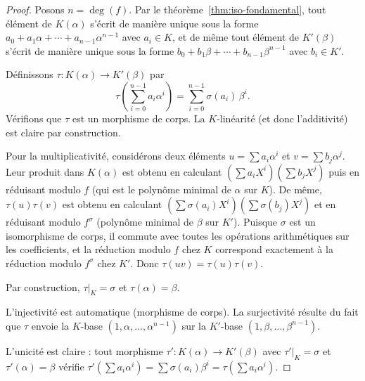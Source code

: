 \documentclass[12pt,a4paper,openany]{book}
\theoremstyle{definition}
\renewcommand{\deg}{\operatorname{deg}}
\begin{document}
\begin{proof}
Posons $n = \deg(f)$. Par le théorème~\ref{thm:iso-fondamental}, tout élément
de $K(\alpha)$ s'écrit de manière unique sous la forme
$a_0 + a_1 \alpha + \cdots + a_{n-1}\alpha^{n-1}$ avec $a_i \in K$, et de même
tout élément de $K'(\beta)$ s'écrit de manière unique sous la forme
$b_0 + b_1 \beta + \cdots + b_{n-1}\beta^{n-1}$ avec $b_i \in K'$.

Définissons $\tau \colon K(\alpha) \to K'(\beta)$ par
\[
  \tau\!\left(\sum_{i=0}^{n-1} a_i \alpha^i\right) = \sum_{i=0}^{n-1} \sigma(a_i)\, \beta^i.
\]
Vérifions que $\tau$ est un morphisme de corps. La $K$-linéarité (et donc
l'additivité) est claire par construction.

Pour la multiplicativité, considérons deux éléments $u = \sum a_i \alpha^i$ et
$v = \sum b_j \alpha^j$. Leur produit dans $K(\alpha)$ est obtenu en calculant
$\left(\sum a_i X^i\right)\left(\sum b_j X^j\right)$ puis en réduisant modulo
$f$ (qui est le polynôme minimal de $\alpha$ sur $K$). De même, $\tau(u)\tau(v)$
est obtenu en calculant
$\left(\sum \sigma(a_i) X^i\right)\left(\sum \sigma(b_j) X^j\right)$ et en
réduisant modulo $f^\sigma$ (polynôme minimal de $\beta$ sur $K'$). Puisque
$\sigma$ est un isomorphisme de corps, il commute avec toutes les opérations
arithmétiques sur les coefficients, et la réduction modulo $f$ chez $K$ correspond
exactement à la réduction modulo $f^\sigma$ chez $K'$. Donc
$\tau(uv) = \tau(u)\tau(v)$.

Par construction, $\tau|_K = \sigma$ et $\tau(\alpha) = \beta$.

L'injectivité est automatique (morphisme de corps). La surjectivité résulte du
fait que $\tau$ envoie la $K$-base $(1, \alpha, \dots, \alpha^{n-1})$ sur la
$K'$-base $(1, \beta, \dots, \beta^{n-1})$.

L'unicité est claire : tout morphisme $\tau' \colon K(\alpha) \to K'(\beta)$
avec $\tau'|_K = \sigma$ et $\tau'(\alpha) = \beta$ vérifie
$\tau'(\sum a_i \alpha^i) = \sum \sigma(a_i)\beta^i = \tau(\sum a_i \alpha^i)$.
\end{proof}

\begin{center}
\end{center}
\end{document}
